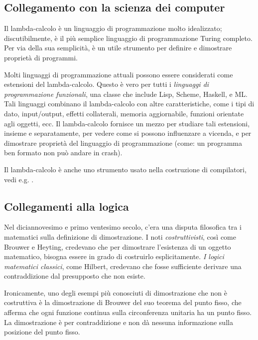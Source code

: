 \documentclass{article}
\begin{document}
\subsection{Collegamento con la scienza dei computer}

Il lambda-calcolo \`e un linguaggio di programmazione molto idealizzato;
discutibilmente, \`e il pi\`u semplice linguaggio di programmazione
Turing completo. Per via della sua semplicit\`a, \`e un utile strumento per
definire e dimostrare propriet\`a di programmi.

Molti linguaggi di programmazione attuali possono essere considerati come
estensioni del lambda-calcolo. Questo \`e vero per tutti i 
{\em linguaggi di programmazione funzionali}, una classe che include 
Lisp, Scheme, Haskell, e ML. Tali linguaggi combinano il lambda-calcolo 
con altre caratteristiche, come i tipi di dato, input/output, effetti 
collaterali, memoria aggiornabile, funzioni orientate agli oggetti, ecc. 
Il lambda-calcolo fornisce un mezzo per studiare tali estensioni, 
insieme e separatamente, per vedere come si possono influenzare a vicenda, 
e per dimostrare propriet\`a del linguaggio di programmazione 
(come: un programma ben formato non pu\`o andare in crash).

Il lambda-calcolo \`e anche uno strumento usato nella costruzione di compilatori, vedi
e.g. \cite{Pey87,App92}.

\subsection{Collegamenti alla logica}

Nel diciannovesimo e primo ventesimo secolo, c'era una disputa
filosofica tra i matematici sulla definizione di dimostrazione. I noti
{\em costruttivisti}, cos\`i come Brouwer e Heyting, credevano che per dimostrare
l'esistenza di un oggetto matematico, bisogna essere in grado di costruirlo
esplicitamente. {\em I logici matematici classici}, come Hilbert, credevano che
fosse sufficiente derivare una contraddizione dal presupposto che non esiste.

Ironicamente, uno degli esempi pi\`u conosciuti di dimostrazione che
non \`e costruttiva \`e la dimostrazione di Brouwer del suo teorema del punto fisso,
che afferma che ogni funzione continua sulla circonferenza unitaria ha
un punto fisso. La dimostrazione \`e per contraddizione e non d\`a 
nessuna informazione sulla posizione del punto fisso.
\end{document}
